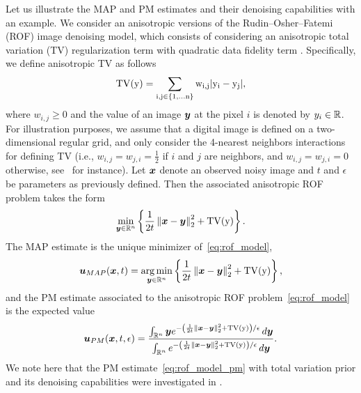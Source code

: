 Let us illustrate the MAP and PM estimates and their denoising capabilities with an example. We consider an anisotropic versions of the Rudin--Osher--Fatemi (ROF) image denoising model, which consists of considering an anisotropic total variation (TV) regularization term with quadratic data fidelity term \cite{bouman1993generalized,chambolle1997image,rudin1992nonlinear}. Specifically, we define anisotropic TV as follows 
$$
\rm{TV}(\boldsymbol{y}) = \sum_{i,j\in\{1,\dots n\}} w_{i,j}|y_i - y_j|,
$$
where $w_{i,j} \geqslant 0$ and the value of an image $\boldsymbol{y}$ at the pixel $i$ is denoted by $y_i \in \mathbb{R}$. For illustration purposes, we assume that a digital image is defined on a two-dimensional regular grid, and only consider the 4-nearest neighbors interactions for defining TV (i.e., $w_{i,j} = w_{j,i} = \frac{1}{2}$  if $i$ and $j$ are neighbors, and $w_{i,j} = w_{j,i} = 0$ otherwise, see~\cite{darbon2006image} for instance). Let $\boldsymbol{x}$ denote an observed noisy image and $t$ and $\epsilon$ be parameters as previously defined. Then the associated anisotropic ROF problem \cite{rudin1992nonlinear} takes the form
\begin{equation}\label{eq:rof_model}
\min_{\boldsymbol{y} \in \mathbb{R}^n}\left\{\frac{1}{2t}\left\Vert{\boldsymbol{x}-\boldsymbol{y}} \right\Vert_{2}^{2} + \rm{TV}(\boldsymbol{y}) \right\}.
\end{equation}
The MAP estimate is the unique minimizer of~\eqref{eq:rof_model},
\begin{equation}\label{eq:rof_model_map}
    \boldsymbol{u}_{MAP}(\boldsymbol{x},t) = \operatorname*{arg\,min}_{\boldsymbol{y} \in \mathbb{R}^n}\left\{\frac{1}{2t}\left\Vert{\boldsymbol{x}-\boldsymbol{y}} \right\Vert_{2}^{2} + \rm{TV}(\boldsymbol{y}) \right\},
\end{equation}
and the PM estimate associated to the anisotropic ROF problem~\eqref{eq:rof_model} is the expected value
\begin{equation}\label{eq:rof_model_pm}
\boldsymbol{u}_{PM}(\boldsymbol{x},t,\epsilon) = \frac{\int_{\mathbb{R}^n} \boldsymbol{y} e^{-\left(\frac{1}{2t}\left\Vert{\boldsymbol{x}-\boldsymbol{y}} \right\Vert_{2}^{2} + \rm{TV}(\boldsymbol{y})\right)/\epsilon} \mathop{}\!d \boldsymbol{y}}{\int_{\mathbb{R}^n} e^{-\left(\frac{1}{2t}\left\Vert{\boldsymbol{x}-\boldsymbol{y}} \right\Vert_{2}^{2} + \rm{TV}(\boldsymbol{y})\right)/\epsilon} \mathop{}\!d\boldsymbol{y}}.
\end{equation}
We note here that the PM estimate~\eqref{eq:rof_model_pm} with total variation prior and its denoising capabilities were investigated in \cite{louchet2008modeles,louchet2013posterior}. 

